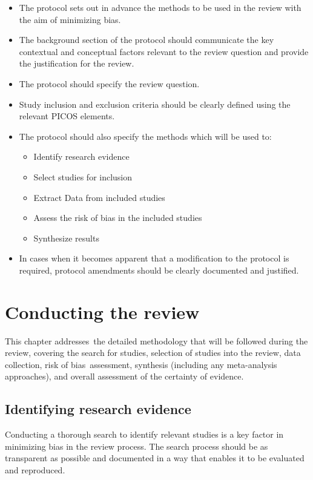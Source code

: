 \documentclass[
  10pt,
  a4paper,
  DIV=11,
  numbers=noendperiod]{scrreprt}
\begin{document}
\begin{itemize}
\item
  The protocol sets out in advance the methods to be used in the review
  with the aim of minimizing bias.
\item
  The background section of the protocol should communicate the key
  contextual and conceptual factors relevant to the review question and
  provide the justification for the review.
\item
  The protocol should specify the review question.
\item
  Study inclusion and exclusion criteria should be clearly defined using
  the relevant PICOS elements.
\item
  The protocol should also specify the methods which will be used to:

  \begin{itemize}
  \item
    Identify research evidence
  \item
    Select studies for inclusion
  \item
    Extract Data from included studies
  \item
    Assess the risk of bias in the included studies
  \item
    Synthesize results
  \end{itemize}
\item
  In cases when it becomes apparent that a modification to the protocol
  is required, protocol amendments should be clearly documented and
  justified.
\end{itemize}

\chapter{Conducting the
review}\label{sec-conducting-systematic-reviews-of-interventions}

This chapter addresses~the detailed methodology that will be followed
during the review, covering the search for studies, selection of studies
into the review, data collection, risk of bias~assessment, synthesis
(including any meta-analysis approaches), and overall assessment of the
certainty of evidence.~

\section{Identifying research
evidence}\label{identifying-research-evidence}

Conducting a thorough search to identify relevant studies is a key
factor in minimizing bias in the review process. The search process
should be as transparent as possible and documented in a way that
enables it to be evaluated and reproduced.
\end{document}

